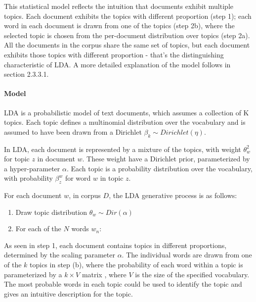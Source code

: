 \documentclass[12pt]{report}
\begin{document}
This statistical model reflects the intuition that documents exhibit multiple
topics. Each document exhibits the topics with different proportion (step 1);
each word in each document is drawn from one of the topics (step 2b), where the
selected topic is chosen from the per-document distribution over topics (step
2a). All the documents in the corpus share the same set of topics, but each
document exhibits those topics with different proportion - that’s the
distinguishing characteristic of LDA. A more detailed explanation of the model
follows in section 2.3.3.1.

\paragraph{Model}

LDA is a probabilistic model of text documents, which assumes a collection of 
K topics. Each topic defines a multinomial distribution over the vocabulary 
and is assumed to have been drawn from a Dirichlet 
$\beta_k \sim Dirichlet(\eta)$. 

In LDA, each document is represented by a mixture of the topics, with weight
$\theta_w^2$ for topic $z$ in document $w$. These weight have a Dirichlet prior,
parameterized by a hyper-parameter $\alpha$. Each topic is a probability
distribution over the vocabulary, with probability $\beta^w_z$ for word $w$ in
topic $z$.
 
For each document $w$, in corpus $D$, the LDA generative process is as follows:

\begin{enumerate}
	\item Draw topic distribution $\theta_w \sim Dir(\alpha)$
	\item For each of the $N$ words $w_n$:
\end{enumerate}


As seen in step 1, each document contains topics in different proportions,
determined by the scaling parameter $\alpha$. The individual words are drawn
from one of the $k$ topics in step (b), where the probability of each word
within a topic is parameterized by a $k \times V$ matrix , where $V$ is the
size of the specified vocabulary. The most probable words in each topic could
be used to identify the topic and gives an intuitive description for the topic.
\end{document}
